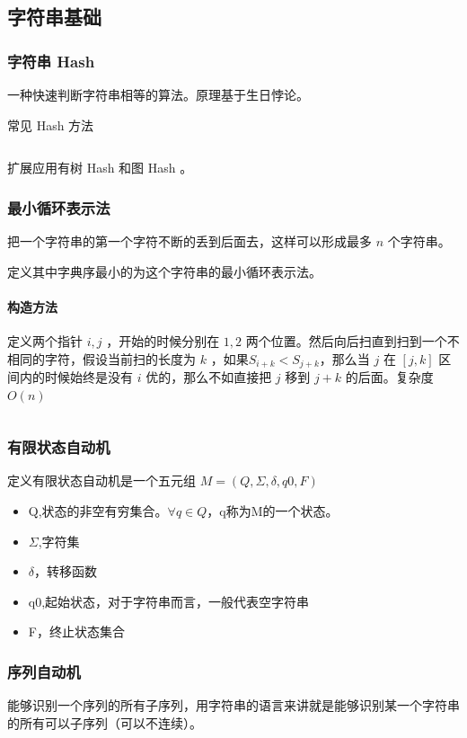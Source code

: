 \documentclass[UTF-8]{ctexart}
\newcommand{\cpp}[1]{\inputminted[bgcolor=bg,breaklines,breakanywhere=true]{c++}{#1}}
\begin{document}
		\subsection{字符串基础}
			\subsubsection{字符串 Hash}
			一种快速判断字符串相等的算法。原理基于生日悖论。
	
			常见 Hash 方法
			\cpp{code//String//hash.cpp}
			扩展应用有树 Hash 和图 Hash 。
			\subsubsection{最小循环表示法}
			把一个字符串的第一个字符不断的丢到后面去，这样可以形成最多 $n$ 个字符串。
			
			定义其中字典序最小的为这个字符串的最小循环表示法。
			
			\paragraph{构造方法} 定义两个指针 $i,j$ ，开始的时候分别在 $1,2$ 两个位置。然后向后扫直到扫到一个不相同的字符，假设当前扫的长度为 $k$ ，如果$S_{i+k} < S_{j+k}$，那么当 $j$ 在 $[j,k]$ 区间内的时候始终是没有 $i$ 优的，那么不如直接把 $j$ 移到 $j+k$ 的后面。复杂度 $O(n)$
			\cpp{code//String//minre.cpp}
			\subsubsection{有限状态自动机}
			定义有限状态自动机是一个五元组 $M=(Q, \Sigma, \delta, q0, F)$
			
			\begin{itemize}
				\item Q,状态的非空有穷集合。$\forall q \in Q$，q称为M的一个状态。
				\item $\Sigma$,字符集
				\item $\delta$，转移函数
				\item q0,起始状态，对于字符串而言，一般代表空字符串
				\item F，终止状态集合
			\end{itemize}
			
			\subsubsection{序列自动机}
			能够识别一个序列的所有子序列，用字符串的语言来讲就是能够识别某一个字符串的所有可以子序列（可以不连续）。
			
\end{document}
